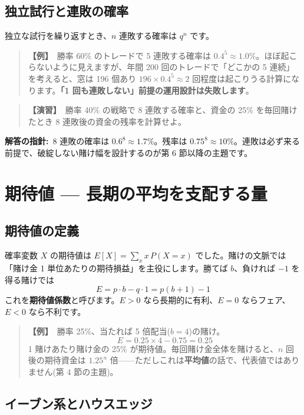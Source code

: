 \documentclass{article}
\begin{document}
\subsection{独立試行と連敗の確率}

独立な試行を繰り返すとき、\(n\) 連敗する確率は \(q^n\) です。

\begin{quote}
\textbf{【例】}\ 勝率 60\% のトレードで 5 連敗する確率は \(0.4^5 \approx 1.0\%\)。ほぼ起こらないように見えますが、年間 200 回のトレードで「どこかの 5 連続」を考えると、窓は 196 個あり \(196 \times 0.4^5 \approx 2\) 回程度は起こりうる計算になります。\textbf{「1 回も連敗しない」前提の運用設計は失敗します}。
\end{quote}

\begin{quote}
\textbf{【演習】}\ 勝率 40\% の戦略で 8 連敗する確率と、資金の 25\% を毎回賭けたとき 8 連敗後の資金の残率を計算せよ。
\end{quote}

\textbf{解答の指針:}\ 8 連敗の確率は \(0.6^8 \approx 1.7\%\)。残率は \(0.75^8 \approx 10\%\)。連敗は必ず来る前提で、破綻しない賭け幅を設計するのが第 6 節以降の主題です。

\section{期待値 — 長期の平均を支配する量}

\subsection{期待値の定義}

確率変数 \(X\) の期待値は \(E[X] = \sum_x x\, P(X = x)\) でした。賭けの文脈では「賭け金 1 単位あたりの期待損益」を主役にします。勝てば \(b\)、負ければ \(-1\) を得る賭けでは
\[ E = p \cdot b - q \cdot 1 = p(b + 1) - 1 \]
これを\textbf{期待値係数}と呼びます。\(E > 0\) なら長期的に有利、\(E = 0\) ならフェア、\(E < 0\) なら不利です。

\begin{quote}
\textbf{【例】}\ 勝率 25\%、当たれば 5 倍配当(\(b = 4\))の賭け。
\[ E = 0.25 \times 4 - 0.75 = 0.25 \]
1 賭けあたり賭け金の 25\% が期待値。毎回賭け金全体を賭けると、\(n\) 回後の期待資金は \(1.25^n\) 倍——ただしこれは\textbf{平均値}の話で、代表値ではありません(第 4 節の主題)。
\end{quote}

\subsection{イーブン系とハウスエッジ}
\end{document}
